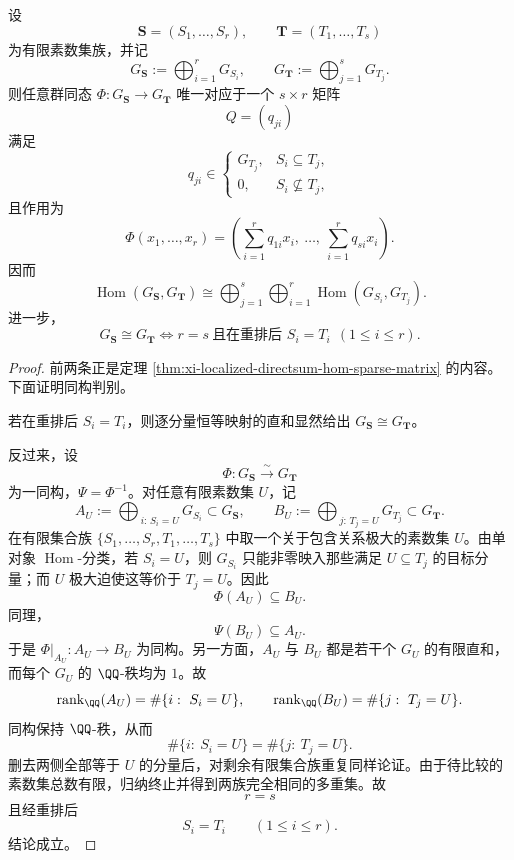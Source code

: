 \begin{theorem}\label{thm:xi-time-part69d-localized-directsum-matrix-isomorphism-criterion}
设
\[
\mathbf S=(S_1,\dots,S_r),
\qquad
\mathbf T=(T_1,\dots,T_s)
\]
为有限素数集族，并记
\[
G_{\mathbf S}:=\bigoplus_{i=1}^{r}G_{S_i},
\qquad
G_{\mathbf T}:=\bigoplus_{j=1}^{s}G_{T_j}.
\]
则任意群同态 \(\Phi:G_{\mathbf S}\to G_{\mathbf T}\) 唯一对应于一个 \(s\times r\) 矩阵
\[
Q=(q_{ji})
\]
满足
\[
q_{ji}\in
\begin{cases}
G_{T_j},& S_i\subseteq T_j,\\
0,& S_i\not\subseteq T_j,
\end{cases}
\]
且作用为
\[
\Phi(x_1,\dots,x_r)=
\left(
\sum_{i=1}^{r}q_{1i}x_i,\ \dots,\ \sum_{i=1}^{r}q_{si}x_i
\right).
\]
因而
\[
\operatorname{Hom}(G_{\mathbf S},G_{\mathbf T})
\cong
\bigoplus_{j=1}^{s}\bigoplus_{i=1}^{r}\operatorname{Hom}(G_{S_i},G_{T_j}).
\]
进一步，
\[
G_{\mathbf S}\cong G_{\mathbf T}
\iff
r=s\ \text{且在重排后 }S_i=T_i\ \ (1\le i\le r).
\]
\end{theorem}
\begin{proof}
前两条正是定理 \ref{thm:xi-localized-directsum-hom-sparse-matrix} 的内容。下面证明同构判别。

若在重排后 \(S_i=T_i\)，则逐分量恒等映射的直和显然给出
\(
G_{\mathbf S}\cong G_{\mathbf T}
\)。

反过来，设
\[
\Phi:G_{\mathbf S}\xrightarrow{\sim} G_{\mathbf T}
\]
为一同构，\(\Psi=\Phi^{-1}\)。对任意有限素数集 \(U\)，记
\[
A_U:=\bigoplus_{\,i:\,S_i=U}G_{S_i}\subset G_{\mathbf S},
\qquad
B_U:=\bigoplus_{\,j:\,T_j=U}G_{T_j}\subset G_{\mathbf T}.
\]
在有限集合族
\(
\{S_1,\dots,S_r,T_1,\dots,T_s\}
\)
中取一个关于包含关系极大的素数集 \(U\)。由单对象 \(\operatorname{Hom}\)-分类，若 \(S_i=U\)，则 \(G_{S_i}\) 只能非零映入那些满足 \(U\subseteq T_j\) 的目标分量；而 \(U\) 极大迫使这等价于 \(T_j=U\)。因此
\[
\Phi(A_U)\subseteq B_U.
\]
同理，
\[
\Psi(B_U)\subseteq A_U.
\]
于是 \(\Phi|_{A_U}:A_U\to B_U\) 为同构。另一方面，\(A_U\) 与 \(B_U\) 都是若干个 \(G_U\) 的有限直和，而每个 \(G_U\) 的 \(\QQ\)-秩均为 \(1\)。故
\[
\operatorname{rank}_{\QQ}(A_U)=\#\{i:\ S_i=U\},
\qquad
\operatorname{rank}_{\QQ}(B_U)=\#\{j:\ T_j=U\}.
\]
同构保持 \(\QQ\)-秩，从而
\[
\#\{i:\ S_i=U\}=\#\{j:\ T_j=U\}.
\]
删去两侧全部等于 \(U\) 的分量后，对剩余有限集合族重复同样论证。由于待比较的素数集总数有限，归纳终止并得到两族完全相同的多重集。故
\[
r=s
\]
且经重排后
\[
S_i=T_i\qquad(1\le i\le r).
\]
结论成立。
\end{proof}

